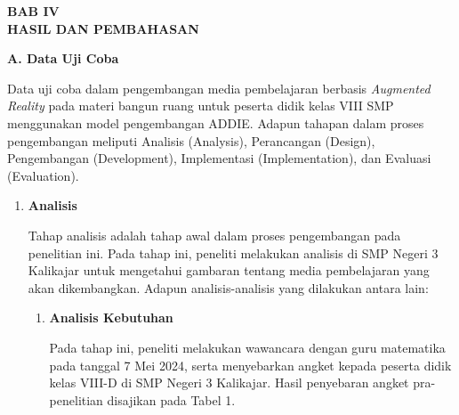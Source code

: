 \documentclass[12pt]{article}
\begin{document}
\begin{center}
    \textbf{BAB IV} \\
    \textbf{HASIL DAN PEMBAHASAN}
\end{center}

\textbf{A. Data Uji Coba}

\hspace*{1cm}Data uji coba dalam pengembangan media pembelajaran berbasis \textit{Augmented Reality} pada materi bangun ruang untuk peserta didik kelas VIII SMP menggunakan model pengembangan ADDIE. Adapun tahapan dalam proses pengembangan meliputi Analisis (Analysis), Perancangan (Design), Pengembangan (Development), Implementasi (Implementation), dan Evaluasi (Evaluation).

\begin{enumerate}[leftmargin=1cm, label=\arabic*.]
    \item \textbf{Analisis}
    
    \hspace*{1cm}Tahap analisis adalah tahap awal dalam proses pengembangan pada penelitian ini. Pada tahap ini, peneliti melakukan analisis di SMP Negeri 3 Kalikajar untuk mengetahui gambaran tentang media pembelajaran yang akan dikembangkan. Adapun analisis-analisis yang dilakukan antara lain:
    
    \begin{enumerate}[label=\textbf{\alph*.}]
        \item \textbf{Analisis Kebutuhan}
        
        \hspace*{1cm}Pada tahap ini, peneliti melakukan wawancara dengan guru matematika pada tanggal 7 Mei 2024, serta menyebarkan angket kepada peserta didik kelas VIII-D di SMP Negeri 3 Kalikajar. Hasil penyebaran angket pra-penelitian disajikan pada Tabel 1.
        

\end{enumerate}
\end{enumerate}
\end{document}
